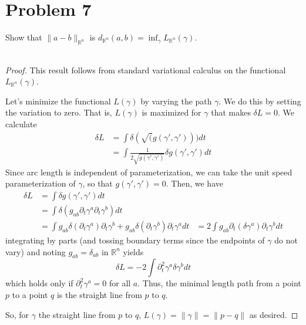 \documentclass[fontsize=11pt]{scrartcl} %
\numberwithin{equation}{section} %
\numberwithin{figure}{section} %
\numberwithin{table}{section} %
\newcommand{\R}{\mathbb{R}}
\begin{document}
\section*{Problem 7}
Show that $\|a-b\|_{\R^n}$ is $d_{\R^n}(a,b) = \inf_{\gamma}L_{\R^n}(\gamma)$.
\\
\\
\begin{proof}
    This result follows from standard variational calculus on the functional
    $L_{\R^n}(\gamma)$. 

    Let's minimize the functional $L(\gamma)$ by varying the path $\gamma$. We
    do this by setting the variation to zero. That is, $L(\gamma)$ is maximized
    for $\gamma$ that makes $\delta L=0$. We calculate
    \[
\begin{aligned}
    \delta L &= \int \delta(\sqrt(g(\gamma',\gamma')))dt\\
    &=\int \frac{1}{2\sqrt{g(\gamma',\gamma')}}\delta g(\gamma',\gamma')dt
\end{aligned}
    \]
    Since arc length is independent of parameterization, we can take the unit
    speed parameterization of $\gamma$, so that $g(\gamma',\gamma')=0$. Then, we
    have
    \[
        \begin{aligned}
            \delta L &= \int \delta g(\gamma',\gamma')dt\\
            &= \int \delta (g_{ab}\partial_t\gamma^a\partial_t\gamma^b)dt\\
            &=\int g_{ab}\delta(\partial_t\gamma^a)\partial_t\gamma^b +
            g_{ab}\delta(\partial_t\gamma^b)\partial_t\gamma^a dt
            &= 2\int g_{ab}\partial_t(\delta\gamma^a)\partial_t\gamma^b dt
        \end{aligned}
    \]
    integrating by parts (and tossing boundary terms since the endpoints of
    $\gamma$ do not vary) and noting $g_{ab} = \delta_{ab}$ in $\R^n$ yields
    \[
        \delta L = -2\int \partial_t^2\gamma^a\delta\gamma^bdt
    \]
    which holds only if $\partial_t^2\gamma^a = 0$ for all $a$. Thus, the
    minimal length path from a point $p$ to a point $q$ is the straight line
    from $p$ to $q$.

    So, for $\gamma$ the straight line from $p$ to $q$, $L(\gamma) = \|\gamma\|
    = \|p-q\|$ as desired.
\end{proof}
\end{document}
